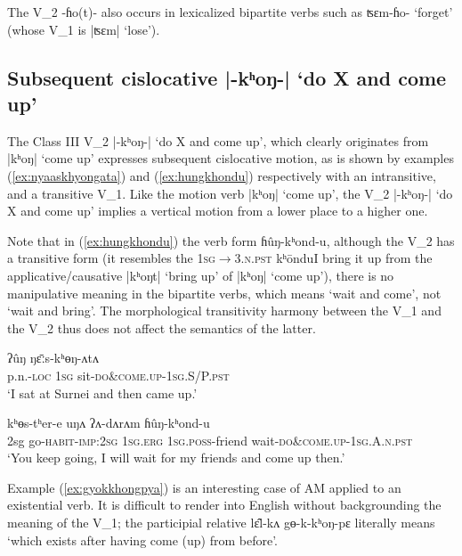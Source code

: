 \documentclass[oneside,a4paper,11pt]{article}
\newcommand{\ipa}[1]{{\phon#1}}
\newcommand{\dhatu}[2]{|\ipa{#1}| `#2'}
\begin{document}
The V_2 \ipa{-ɦo(t)-} also occurs in lexicalized bipartite verbs such as \ipa{ʦɛm-ɦo-} `forget' (whose V_1 is \dhatu{ʦɛm}{lose}).

\subsection{Subsequent cislocative \dhatu{-kʰoŋ-}{do X and come up}} \label{sec:v2.khoN}
The Class III V_2 \dhatu{-kʰoŋ-}{do X and come up}, which clearly originates from \dhatu{kʰoŋ}{come up} expresses subsequent cislocative motion, as is shown by examples (\ref{ex:nyaaskhyongata}) and (\ref{ex:hungkhondu}) respectively with an intransitive, and a transitive V_1. Like the motion verb  \dhatu{kʰoŋ}{come up}, the V_2  \dhatu{-kʰoŋ-}{do X and come up} implies a vertical motion from a lower place to a higher one.

Note that in (\ref{ex:hungkhondu}) the verb form \ipa{ɦûŋ-kʰond-u}, although the V_2 has a transitive form (it resembles the \textsc{1sg$\rightarrow$3.n.pst} \ipa{kʰōndu}{I bring it up} from the applicative/causative \dhatu{kʰoŋt}{bring up} of \dhatu{kʰoŋ}{come up}), there is no manipulative meaning in the bipartite verbs, which means `wait and come', not `wait and bring'. The morphological transitivity harmony between the V_1 and the V_2 thus does not affect the semantics of the latter.

\begin{exe}
\ex \label{ex:nyaaskhyongata}
 \gll  \ipa{sʉ̂rnɛj-bi} \ipa{ʔûŋ} \ipa{ŋɛ̄ːs-kʰɵŋ-ʌtʌ} \\
 p.n.-\textsc{loc} \textsc{1sg} sit-\textsc{do\&come.up}-\textsc{1sg.S/P.pst} \\
\glt  `I sat at Surnei and then came up.'
\end{exe}

\begin{exe}  
\ex \label{ex:hungkhondu}
 \gll  \ipa{ʔīn} \ipa{kʰɵs-tʰer-e} \ipa{uŋʌ} \ipa{ʔʌ-dʌrʌm} \ipa{ɦûŋ-kʰond-u} \\
 2sg go-\textsc{habit}-\textsc{imp}:\textsc{2sg} \textsc{1sg}.\textsc{erg} \textsc{1sg}.\textsc{poss}-friend wait-\textsc{do\&come.up}-\textsc{1sg.A.n.pst} \\
\glt `You keep going, I will wait for my friends and come up then.'
\end{exe}

Example (\ref{ex:gyokkhongpya}) is an interesting case of AM applied to an existential verb. It is difficult to render into English without backgrounding the meaning of the V_1; the participial relative \ipa{lɛ̂l-kʌ} \ipa{gɵ-k-kʰoŋ-pɛ} literally means `which exists after having come (up) from before'.
\end{document}
